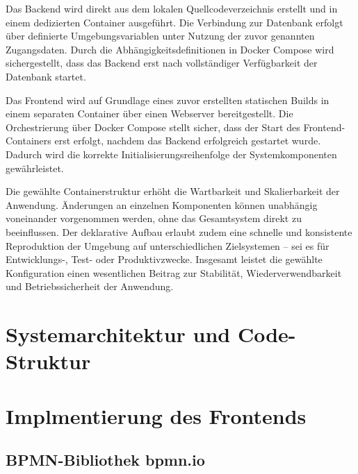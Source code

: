 Das Backend wird direkt aus dem lokalen Quellcodeverzeichnis erstellt und in einem dedizierten Container ausgeführt. Die Verbindung zur Datenbank erfolgt über definierte Umgebungsvariablen unter Nutzung der zuvor genannten Zugangsdaten. Durch die Abhängigkeitsdefinitionen in Docker Compose wird sichergestellt, dass das Backend erst nach vollständiger Verfügbarkeit der Datenbank startet.

Das Frontend wird auf Grundlage eines zuvor erstellten statischen Builds in einem separaten Container über einen Webserver bereitgestellt. Die Orchestrierung über Docker Compose stellt sicher, dass der Start des Frontend-Containers erst erfolgt, nachdem das Backend erfolgreich gestartet wurde. Dadurch wird die korrekte Initialisierungsreihenfolge der Systemkomponenten gewährleistet.

Die gewählte Containerstruktur erhöht die Wartbarkeit und Skalierbarkeit der Anwendung. Änderungen an einzelnen Komponenten können unabhängig voneinander vorgenommen werden, ohne das Gesamtsystem direkt zu beeinflussen. Der deklarative Aufbau erlaubt zudem eine schnelle und konsistente Reproduktion der Umgebung auf unterschiedlichen Zielsystemen – sei es für Entwicklungs-, Test- oder Produktivzwecke. Insgesamt leistet die gewählte Konfiguration einen wesentlichen Beitrag zur Stabilität, Wiederverwendbarkeit und Betriebssicherheit der Anwendung.























\iffalse

\section{Systemarchitektur und Code-Struktur}


\section{Implmentierung des Frontends}
\subsection{BPMN-Bibliothek bpmn.io}



